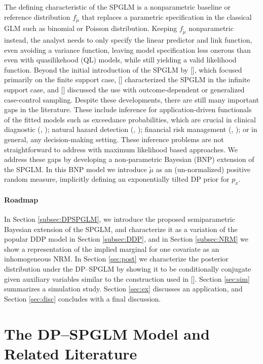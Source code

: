 \documentclass{article}[12pt]
\newcommand{\blau}{\color{blue}}
\newcommand{\citeaa}[1]{\citeauthor{#1}, \href{cite.#1}{\textcolor{blue}{\citeyear{#1}}}}     %
\newcommand{\citeab}[1]{\citeauthor{#1} [\href{cite.#1}{\textcolor{blue}{\citeyear{#1}}}]}  %
\newcommand{\refa}[1]{\textcolor{blue}{\ref{#1}}} %
\newcommand{\tmu}{\widetilde{\mu}}
\begin{document}
The defining characteristic of the SPGLM is a nonparametric baseline
or reference distribution $f_{\tmu}$ that replaces a parametric
specification in the classical GLM such as binomial or Poisson
distribution. Keeping $f_{\tmu}$ nonparametric instead, the analyst
needs to only specify the linear predictor and link function, even
avoiding a variance function, leaving model specification less onerous than
even with quasilikehood (QL) models, while still yielding a valid
likelihood function.
Beyond the initial introduction of the SPGLM by
\citeab{rathouz2009generalized}, which focused primarily on the
finite support case,  
\citeab{huang2014joint} characterized the SPGLM in the infinite support case, and
\citeab{maronge2023generalized} discussed the use with outcome-dependent or generalized case-control sampling.
Despite these developments, there are still many important gaps in the
literature. These include inference for application-driven functionals of
the fitted models such as exceedance probabilities, which are crucial
in clinical diagnostic (\citeaa{paul2021dynamics}); natural hazard
detection (\citeaa{kossin2020global}); financial risk management
(\citeaa{taylor2016using}); or in general, any decision-making
setting. These inference problems are not straightforward to address with
maximum likelihood based approaches. We address these gaps by developing a non-parametric Bayesian (BNP)
extension of the SPGLM.
In this BNP model we introduce $\tmu$ as an (un-normalized) positive
random measure, implicitly defining an exponentially tilted DP prior
for $p_x$. 


\paragraph*{\blau Roadmap}
In Section \refa{subsec:DPSPGLM}, we introduce the proposed semiparametric Bayesian extension of the SPGLM, and characterize it as a variation of the popular DDP model in Section \refa{subsec:DDP}, and in Section \refa{subsec:NRM} we show a representation of the implied marginal for one covariate as an inhomogeneous NRM.
In Section \refa{sec:post} we characterize the posterior distribution
under the DP--SPGLM by showing it to be conditionally conjugate given
auxiliary variables similar to the construction used in
\citeab{james2009posterior}.  
Section \refa{sec:sim} summarizes a simulation study. Section \refa{sec:ex} discusses an application, and Section \refa{sec:disc} concludes with a final discussion.

\section{The DP--SPGLM Model and Related Literature}
\label{sec:DPSPGLM}
\end{document}
